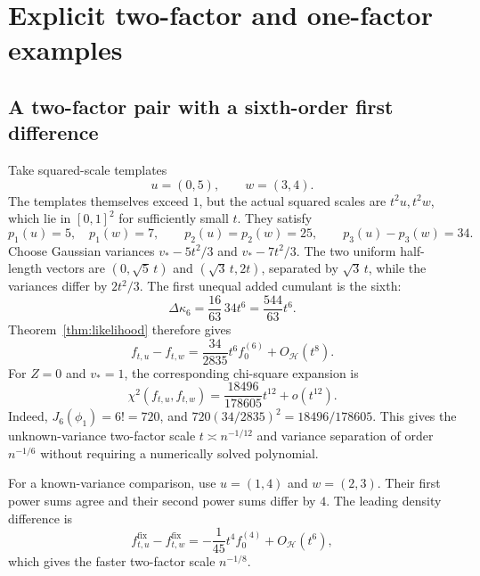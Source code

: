 \documentclass[11pt,a4paper]{article}
\numberwithin{equation}{section}
\theoremstyle{definition}
\theoremstyle{remark}
\newcommand{\kap}{\kappa}
\begin{document}
\section{Explicit two-factor and one-factor examples}
\label{sec:examples}

\subsection{A two-factor pair with a sixth-order first difference}
Take squared-scale templates
\begin{equation}
 u=(0,5),\qquad w=(3,4).
 \label{eq:explicitpair}
\end{equation}
The templates themselves exceed $1$, but the actual squared scales are
$t^2u,t^2w$, which lie in $[0,1]^2$ for sufficiently small $t$. They satisfy
\begin{equation}
 p_1(u)=5,\quad p_1(w)=7,\qquad
 p_2(u)=p_2(w)=25,\qquad p_3(u)-p_3(w)=34.
\end{equation}
Choose Gaussian variances $v_*-5t^2/3$ and $v_*-7t^2/3$. The two uniform
half-length vectors are $(0,\sqrt5\,t)$ and $(\sqrt3\,t,2t)$, separated by
$\sqrt3\,t$, while the variances differ by $2t^2/3$. The first unequal added
cumulant is the sixth:
\begin{equation}
 \Delta\kap_6=\frac{16}{63}\,34t^6=\frac{544}{63}t^6.
\end{equation}
Theorem~\ref{thm:likelihood} therefore gives
\begin{equation}
 f_{t,u}-f_{t,w}=\frac{34}{2835}t^6 f_0^{(6)}+O_{\mathcal H}(t^8).
 \label{eq:explicitdensity}
\end{equation}
For $Z=0$ and $v_*=1$, the corresponding chi-square expansion is
\begin{equation}
 \chi^2(f_{t,u},f_{t,w})
 =\frac{18496}{178605}t^{12}+o(t^{12}).
 \label{eq:explicitchi}
\end{equation}
Indeed, $J_6(\phi_1)=6!=720$, and
$720(34/2835)^2=18496/178605$. This gives the unknown-variance two-factor
scale $t\asymp n^{-1/12}$ and variance separation of order $n^{-1/6}$ without
requiring a numerically solved polynomial.

For a known-variance comparison, use $u=(1,4)$ and $w=(2,3)$.
Their first power sums agree and their second power sums differ by $4$.
The leading density difference is
\begin{equation}
 f_{t,u}^{\mathrm{fix}}-f_{t,w}^{\mathrm{fix}}
   =-\frac1{45}t^4f_0^{(4)}+O_{\mathcal H}(t^6),
\end{equation}
which gives the faster two-factor scale $n^{-1/8}$.
\end{document}
